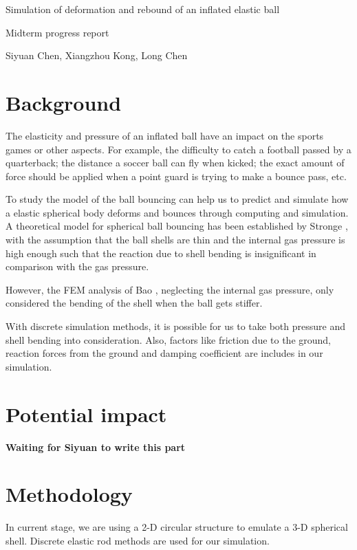 \documentclass[letterpaper,9pt]{article}
\begin{document}
\begin{center}
	\Large
	Simulation of deformation and rebound of an inflated elastic ball 
	 
	Midterm progress report
	
	\vspace{1em}
	\large
	Siyuan Chen, Xiangzhou Kong, Long Chen
\end{center}
\vspace{1em}
\begin{multicols}{2}
	\section{Background}
		The elasticity and pressure of an inflated ball have an impact on the sports games or other aspects. For example, the difficulty to catch a football passed by a quarterback; the distance a soccer ball can fly when kicked; the exact amount of force should be applied when a point guard is trying to make a bounce pass, etc. 
		
		To study the model of the ball bouncing can help us to predict and simulate how a elastic spherical body deforms and bounces through computing and simulation. 
		A theoretical model for spherical ball bouncing has been established by Stronge \cite{Stronge06}, with the assumption that the ball shells are thin and the internal gas pressure is high enough such that the reaction due to shell bending is insignificant in comparison with the gas pressure. 
		
		However, the FEM analysis of Bao \cite{Bao15}, neglecting the internal gas pressure, only considered the bending of the shell when the ball gets stiffer. 
		
		With discrete simulation methods, it is possible for us to take both pressure and shell bending into consideration. Also, factors like friction due to the ground, reaction forces from the ground and damping coefficient are includes in our simulation. 
	\section{Potential impact}
		\textbf{Waiting for Siyuan to write this part}
	\section{Methodology}
		In current stage, we are using a 2-D circular structure to emulate a 3-D spherical shell. Discrete elastic rod \cite{Bergou08} methods are used for our simulation.	


\end{multicols}
\end{document}
